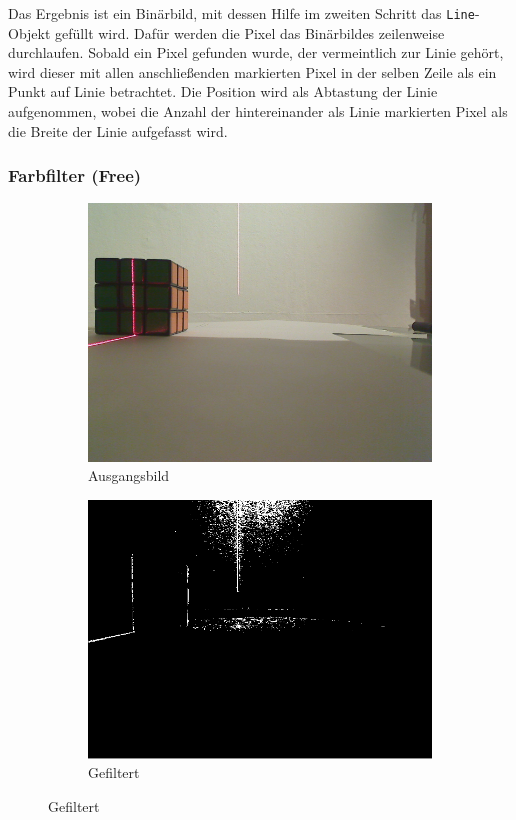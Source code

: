 \documentclass[ngerman,a4paper,parskip=half]{scrartcl}
\begin{document}
Das Ergebnis ist ein Binärbild, mit dessen Hilfe im zweiten Schritt das \texttt{Line}-Objekt gefüllt wird. Dafür werden die Pixel das Binärbildes zeilenweise durchlaufen. Sobald ein Pixel gefunden wurde, der vermeintlich zur Linie gehört, wird dieser mit allen anschließenden markierten Pixel in der selben Zeile als ein Punkt auf Linie betrachtet. Die Position wird als Abtastung der Linie aufgenommen, wobei die Anzahl der hintereinander als Linie markierten Pixel als die Breite der Linie aufgefasst wird.

\subsubsection{Farbfilter (Free)}

\begin{figure}[H]
	\centering

	\begin{subfigure}{0.45\textwidth}
		\includegraphics[width=\textwidth]{includes/line_line.png}
		\caption{Ausgangsbild}
	\end{subfigure}
	\hfill
	\begin{subfigure}{0.45\textwidth}
		\includegraphics[width=\textwidth]{includes/line_free.png}
		\caption{Gefiltert}
	\end{subfigure}


\end{figure}
\end{document}
